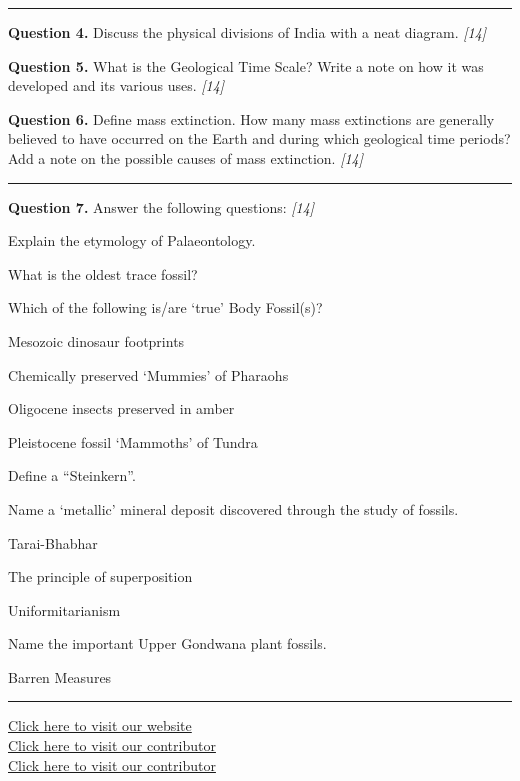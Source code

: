 \documentclass[11pt,a4paper]{article}
\newcommand{\pts}[1]{\hfill   \textit{[#1]}}
\begin{document}
\rule{\linewidth}{0.4pt}\smallskip




\noindent   \textbf{Question 4.} Discuss the physical divisions of India with a neat diagram. \pts{14}

\medskip


\noindent   \textbf{Question 5.} What is the Geological Time Scale? Write a note on how it was developed and its various uses. \pts{14}

\medskip


\noindent   \textbf{Question 6.} Define mass extinction. How many mass extinctions are generally believed to have occurred on the Earth and during which geological time periods? Add a note on the possible causes of mass extinction. \pts{14}

\bigskip


\rule{\linewidth}{0.4pt}\smallskip




\noindent   \textbf{Question 7.} Answer the following questions: \pts{14}

\begin{parts}
  \item Explain the etymology of Palaeontology.
  \item What is the oldest trace fossil?
  \item Which of the following is/are `true' Body Fossil(s)?
  
\begin{subparts}
    \item Mesozoic dinosaur footprints
    \item Chemically preserved `Mummies' of Pharaohs
    \item Oligocene insects preserved in amber
    \item Pleistocene fossil `Mammoths' of Tundra
  \end{subparts}
  \item Define a ``Steinkern''.
  \item Name a `metallic' mineral deposit discovered through the study of fossils.
  \item Tarai-Bhabhar
  \item The principle of superposition
  \item Uniformitarianism
  \item Name the important Upper Gondwana plant fossils.
  \item Barren Measures
\end{parts}

\vfill\rule{\linewidth}{0.4pt}

\begin{center}\small
\href{https://bhu-exam.vercel.app/}{Click here to visit our website}\\[4pt]
\href{https://me-aryan.vercel.app/}{Click here to visit our contributor}\\[4pt]
\href{https://quashan-me.vercel.app/}{Click here to visit our contributor}
\end{center}
\end{document}
